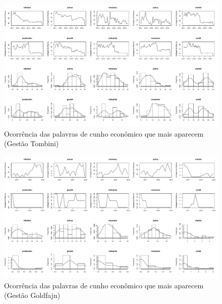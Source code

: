 \begin{landscape}
\begin{figure}
    \centering
    \includegraphics[width=1.5\textwidth]{capitulos/figures/analiseeconomicatombini.pdf}
    \caption{Ocorrência das palavras de cunho econômico que mais aparecem (Gestão Tombini)}
    \label{fig:analiseeconomicatombini}
\end{figure}
\end{landscape}

\begin{landscape}
\begin{figure}
    \centering
    \includegraphics[width=1.5\textwidth]{capitulos/figures/analiseeconomicagoldfajn.pdf}
    \caption{Ocorrência das palavras de cunho econômico que mais aparecem (Gestão Goldfajn)}
    \label{fig:analiseeconomicagoldfajn}
\end{figure}
\end{landscape}